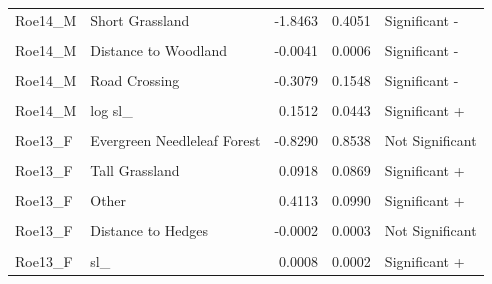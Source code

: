 \documentclass[10pt,a4paper]{article}
\begin{document}
\begin{longtable}[t]{llrrl}
Roe14\_M & Short Grassland & -1.8463 & 0.4051 & Significant -\\
\cellcolor{gray!10}{Roe14\_M} & \cellcolor{gray!10}{Human Settlements} & \cellcolor{gray!10}{-15.6869} & \cellcolor{gray!10}{947.9684} & \cellcolor{gray!10}{Not Significant}\\
\addlinespace
Roe14\_M & Distance to Woodland & -0.0041 & 0.0006 & Significant -\\
\cellcolor{gray!10}{Roe14\_M} & \cellcolor{gray!10}{Distance to Hedges} & \cellcolor{gray!10}{-0.0021} & \cellcolor{gray!10}{0.0004} & \cellcolor{gray!10}{Significant -}\\
Roe14\_M & Road Crossing & -0.3079 & 0.1548 & Significant -\\
\cellcolor{gray!10}{Roe14\_M} & \cellcolor{gray!10}{sl\_} & \cellcolor{gray!10}{0.0005} & \cellcolor{gray!10}{0.0003} & \cellcolor{gray!10}{Significant +}\\
Roe14\_M & log sl\_ & 0.1512 & 0.0443 & Significant +\\
\addlinespace
\cellcolor{gray!10}{Roe14\_M} & \cellcolor{gray!10}{cos ta\_} & \cellcolor{gray!10}{-0.2494} & \cellcolor{gray!10}{0.0444} & \cellcolor{gray!10}{Significant -}\\
Roe13\_F & Evergreen Needleleaf Forest & -0.8290 & 0.8538 & Not Significant\\
\cellcolor{gray!10}{Roe13\_F} & \cellcolor{gray!10}{Cropland} & \cellcolor{gray!10}{-0.4514} & \cellcolor{gray!10}{0.1075} & \cellcolor{gray!10}{Significant -}\\
Roe13\_F & Tall Grassland & 0.0918 & 0.0869 & Significant +\\
\cellcolor{gray!10}{Roe13\_F} & \cellcolor{gray!10}{Human Settlements} & \cellcolor{gray!10}{-14.1980} & \cellcolor{gray!10}{792.3770} & \cellcolor{gray!10}{Not Significant}\\
\addlinespace
Roe13\_F & Other & 0.4113 & 0.0990 & Significant +\\
\cellcolor{gray!10}{Roe13\_F} & \cellcolor{gray!10}{Distance to Woodland} & \cellcolor{gray!10}{-0.0049} & \cellcolor{gray!10}{0.0006} & \cellcolor{gray!10}{Significant -}\\
Roe13\_F & Distance to Hedges & -0.0002 & 0.0003 & Not Significant\\
\cellcolor{gray!10}{Roe13\_F} & \cellcolor{gray!10}{Road Crossing} & \cellcolor{gray!10}{-1.1608} & \cellcolor{gray!10}{0.1250} & \cellcolor{gray!10}{Significant -}\\
Roe13\_F & sl\_ & 0.0008 & 0.0002 & Significant +\\

\end{longtable}
\end{document}

